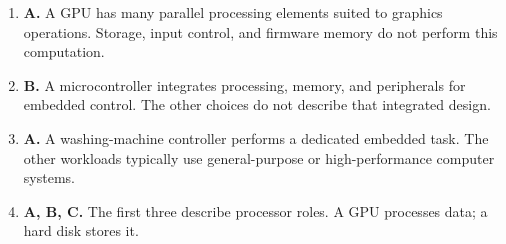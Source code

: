 \begin{enumerate}[label=\textbf{Q\arabic*.}, leftmargin=*]
\item \textbf{A.} A GPU has many parallel processing elements suited to graphics operations. Storage, input control, and firmware memory do not perform this computation.

\item \textbf{B.} A microcontroller integrates processing, memory, and peripherals for embedded control. The other choices do not describe that integrated design.

\item \textbf{A.} A washing-machine controller performs a dedicated embedded task. The other workloads typically use general-purpose or high-performance computer systems.

\item \textbf{A, B, C.} The first three describe processor roles. A GPU processes data; a hard disk stores it.

\end{enumerate}
